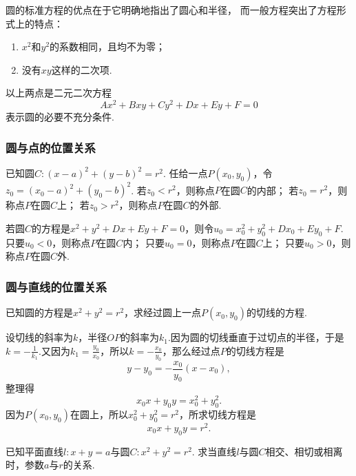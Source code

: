 圆的标准方程的优点在于它明确地指出了圆心和半径，
而一般方程突出了方程形式上的特点：\begin{enumerate}
	\item \(x^2\)和\(y^2\)的系数相同，且均不为零；
	\item 没有\(xy\)这样的二次项.
\end{enumerate}
以上两点是二元二次方程\[
	A x^2 + B xy + C y^2 + D x + E y + F = 0
\]表示圆的必要不充分条件.

\subsubsection{圆与点的位置关系}
已知圆\(C: (x-a)^2+(y-b)^2=r^2\).
任给一点\(P(x_0,y_0)\)，令\(z_0 = (x_0-a)^2+(y_0-b)^2\).
若\(z_0 < r^2\)，则称点\(P\)在圆\(C\)的内部；
若\(z_0 = r^2\)，则称点\(P\)在圆\(C\)上；
若\(z_0 > r^2\)，则称点\(P\)在圆\(C\)的外部.

若圆\(C\)的方程是\(x^2+y^2+Dx+Ey+F=0\)，则令\(u_0 = x_0^2+y_0^2+Dx_0+Ey_0+F\).
只要\(u_0 < 0\)，则称点\(P\)在圆\(C\)内；
只要\(u_0 = 0\)，则称点\(P\)在圆\(C\)上；
只要\(u_0 > 0\)，则称点\(P\)在圆\(C\)外.

\subsubsection{圆与直线的位置关系}
\begin{example}
已知圆的方程是\(x^2+y^2 = r^2\)，求经过圆上一点\(P(x_0,y_0)\)的切线的方程.
\begin{solution}
设切线的斜率为\(k\)，半径\(OP\)的斜率为\(k_1\).因为圆的切线垂直于过切点的半径，于是\(k = -\frac{1}{k_1}\).又因为\(k_1 = \frac{y_0}{x_0}\)，所以\(k = -\frac{x_0}{y_0}\)，那么经过点\(P\)的切线方程是\[
y-y_0 = -\frac{x_0}{y_0} (x-x_0),
\]整理得\[
x_0 x + y_0 y = x_0^2 + y_0^2.
\]因为\(P(x_0,y_0)\)在圆上，所以\(x_0^2 + y_0^2 = r^2\)，所求切线方程是\begin{equation}
x_0 x + y_0 y = r^2.
\end{equation}
\end{solution}
\end{example}

\begin{example}
已知平面直线\(l: x + y = a\)与圆\(C: x^2 + y^2 = r^2\).
求当直线\(l\)与圆\(C\)相交、相切或相离时，参数\(a\)与\(r\)的关系.
\end{example}

